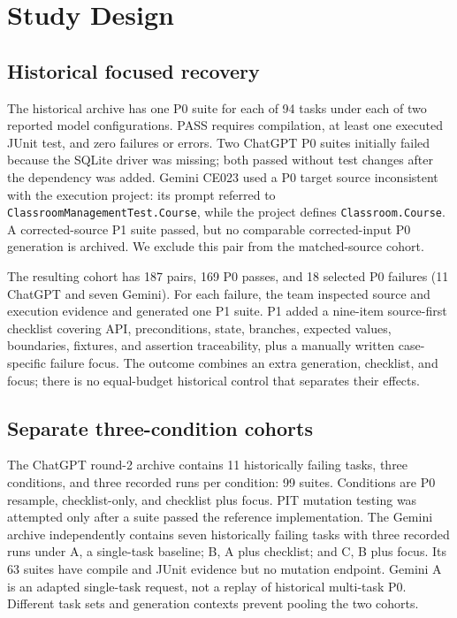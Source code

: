 \documentclass[conference]{IEEEtran}
\begin{document}
\section{Study Design}
\subsection{Historical focused recovery}
The historical archive has one P0 suite for each of 94 tasks under each of two reported model configurations. PASS requires compilation, at least one executed JUnit test, and zero failures or errors. Two ChatGPT P0 suites initially failed because the SQLite driver was missing; both passed without test changes after the dependency was added. Gemini CE023 used a P0 target source inconsistent with the execution project: its prompt referred to \texttt{ClassroomManagementTest.Course}, while the project defines \texttt{Classroom.Course}. A corrected-source P1 suite passed, but no comparable corrected-input P0 generation is archived. We exclude this pair from the matched-source cohort.

The resulting cohort has 187 pairs, 169 P0 passes, and 18 selected P0 failures (11 ChatGPT and seven Gemini). For each failure, the team inspected source and execution evidence and generated one P1 suite. P1 added a nine-item source-first checklist covering API, preconditions, state, branches, expected values, boundaries, fixtures, and assertion traceability, plus a manually written case-specific failure focus. The outcome combines an extra generation, checklist, and focus; there is no equal-budget historical control that separates their effects.

\subsection{Separate three-condition cohorts}
The ChatGPT round-2 archive contains 11 historically failing tasks, three conditions, and three recorded runs per condition: 99 suites. Conditions are P0 resample, checklist-only, and checklist plus focus. PIT mutation testing was attempted only after a suite passed the reference implementation. The Gemini archive independently contains seven historically failing tasks with three recorded runs under A, a single-task baseline; B, A plus checklist; and C, B plus focus. Its 63 suites have compile and JUnit evidence but no mutation endpoint. Gemini A is an adapted single-task request, not a replay of historical multi-task P0. Different task sets and generation contexts prevent pooling the two cohorts.
\end{document}
